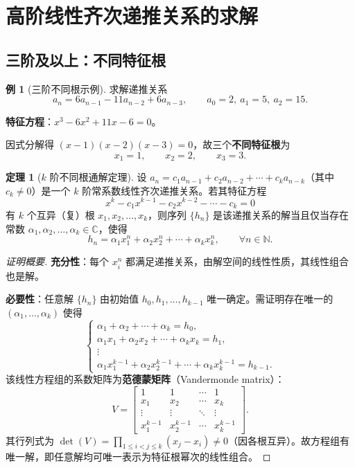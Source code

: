 \documentclass[UTF8,11pt,a4paper]{ctexbook}   %
\theoremstyle{definition}
\newtheorem{theorem}{定理}[section]
\newtheorem{example}{例}[section]
\begin{document}
\section{高阶线性齐次递推关系的求解}

\subsection{三阶及以上：不同特征根}

\begin{example}[三阶不同根示例]
求解递推关系
\[
a_n = 6a_{n-1} - 11a_{n-2} + 6a_{n-3},\qquad a_0 = 2,\ a_1 = 5,\ a_2 = 15.
\]

\textbf{特征方程}：$x^3 - 6x^2 + 11x - 6 = 0$。

因式分解得 $(x-1)(x-2)(x-3) = 0$，故三个\textbf{不同特征根}为
\[
x_1 = 1,\qquad x_2 = 2,\qquad x_3 = 3.
\]
\end{example}

\begin{theorem}[$k$ 阶不同根通解定理]
设 $a_n = c_1 a_{n-1} + c_2 a_{n-2} + \cdots + c_k a_{n-k}$（其中 $c_k \neq 0$）是一个 $k$ 阶常系数线性齐次递推关系。若其特征方程
\[
x^k - c_1 x^{k-1} - c_2 x^{k-2} - \cdots - c_k = 0
\]
有 $k$ 个互异（复）根 $x_1, x_2, \dots, x_k$，则序列 $\{h_n\}$ 是该递推关系的解当且仅当存在常数 $\alpha_1, \alpha_2, \dots, \alpha_k \in \mathbb{C}$，使得
\[
h_n = \alpha_1 x_1^n + \alpha_2 x_2^n + \cdots + \alpha_k x_k^n,\qquad \forall n \in \mathbb{N}.
\]
\end{theorem}

\begin{proof}[证明概要]
\textbf{充分性}：每个 $x_i^n$ 都满足递推关系，由解空间的线性性质，其线性组合也是解。

\textbf{必要性}：任意解 $\{h_n\}$ 由初始值 $h_0, h_1, \dots, h_{k-1}$ 唯一确定。需证明存在唯一的 $(\alpha_1,\dots,\alpha_k)$ 使得
\[
\begin{cases}
\alpha_1 + \alpha_2 + \cdots + \alpha_k = h_0,\\[0.3em]
\alpha_1 x_1 + \alpha_2 x_2 + \cdots + \alpha_k x_k = h_1,\\[0.3em]
\vdots\\[0.3em]
\alpha_1 x_1^{k-1} + \alpha_2 x_2^{k-1} + \cdots + \alpha_k x_k^{k-1} = h_{k-1}.
\end{cases}
\]
该线性方程组的系数矩阵为\textbf{范德蒙矩阵}（Vandermonde matrix）：
\[
V = \begin{bmatrix}
1 & 1 & \cdots & 1\\
x_1 & x_2 & \cdots & x_k\\
\vdots & \vdots & \ddots & \vdots\\
x_1^{k-1} & x_2^{k-1} & \cdots & x_k^{k-1}
\end{bmatrix}.
\]
其行列式为 $\det(V) = \prod_{1\le i<j\le k}(x_j - x_i) \neq 0$（因各根互异）。故方程组有唯一解，即任意解均可唯一表示为特征根幂次的线性组合。
\end{proof}
\end{document}
